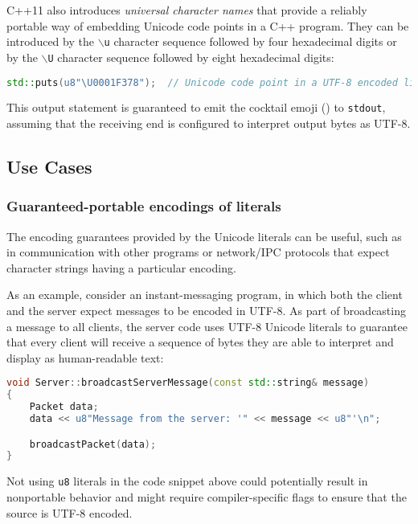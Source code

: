 \noindent C++11 also introduces \emph{universal character names} that provide a
reliably portable way of embedding Unicode code points in a C++ program.
They can be introduced by the \texttt{$\backslash$u} character
sequence followed by four hexadecimal digits or by the
\texttt{$\backslash$U} character sequence followed by eight
hexadecimal digits:

\begin{lstlisting}[language=C++]
std::puts(u8"\U0001F378");  // Unicode code point in a UTF-8 encoded literal
\end{lstlisting}
    
\noindent This output statement is guaranteed to emit the cocktail emoji
(\martini) to \texttt{stdout}, assuming that the receiving end is configured to
interpret output bytes as UTF-8.

\subsection[Use Cases]{Use Cases}\label{use-cases}

\subsubsection[Guaranteed-portable encodings of literals]{Guaranteed-portable encodings of literals}\label{guaranteed-portable-encodings-of-literals}

The encoding guarantees provided by the Unicode literals can be useful,
such as in communication with other programs or network/IPC protocols that
expect character strings having a particular encoding.

As an example, consider an instant-messaging program, in which both the
client and the server expect messages to be encoded in UTF-8. As part of
broadcasting a message to all clients, the server code uses UTF-8
Unicode literals to guarantee that every client will receive a sequence
of bytes they are able to interpret and display as human-readable text:

\begin{lstlisting}[language=C++]
void Server::broadcastServerMessage(const std::string& message)
{
    Packet data;
    data << u8"Message from the server: '" << message << u8"'\n";

    broadcastPacket(data);
}
\end{lstlisting}
    
\noindent Not using \texttt{u8} literals in the code snippet above could potentially result in
nonportable behavior and might require compiler-specific flags to
ensure that the source is UTF-8 encoded.

